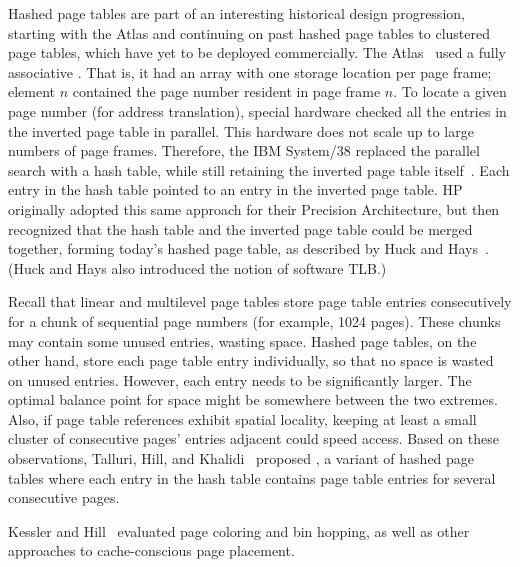 Hashed page tables are part of an interesting historical design
progression, starting with the Atlas and continuing on past hashed
page tables to clustered page tables, which have yet to be deployed
commercially.
The Atlas~\cite{max1052,max1053} used a fully associative
.  That is, it had an array with one storage
location per page frame; element $n$ contained the page number
resident in page frame $n$.  To locate a given page number (for
address translation), special hardware checked all the entries in the
inverted page table in parallel.  This hardware does not scale up to
large numbers of page frames.  Therefore, the IBM
System/38
replaced the parallel search with a hash table, while still retaining
the inverted page table itself~\cite{max1080}.  Each entry in the hash table pointed
to an entry in the inverted page table.  HP originally adopted this
same approach for their Precision Architecture, but then recognized
that the hash table and the inverted page table could be merged
together, forming today's hashed page table, as described by
Huck and
Hays~\cite{max1070}.  (Huck and Hays also introduced the notion of
software TLB.)

Recall that linear and multilevel page tables store page table
entries consecutively for a chunk of sequential page numbers (for
example, 1024 pages).  These chunks may contain some unused
entries, wasting space.  Hashed page tables, on the other hand, store
each page table entry individually, so that no space is wasted on unused
entries.  However, each entry needs to be significantly larger.  The
optimal balance point for space might be somewhere between the two
extremes.  Also, if page table references exhibit spatial locality,
keeping at least a small cluster of consecutive pages' entries
adjacent could speed access.  Based on these observations,
Talluri,
Hill, and Khalidi~\cite{max1060} proposed , a
variant of hashed page tables where each entry in the hash table
contains page table entries for several consecutive pages.

Kessler and Hill~\cite{max732} evaluated page coloring and bin
hopping, as well as other approaches to cache-conscious page
placement.

